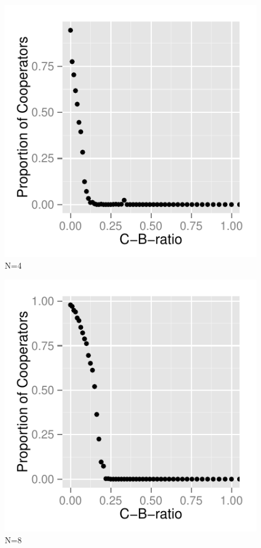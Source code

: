 \documentclass[DIV=calc, paper=a4, fontsize=11pt, twocolumn]{scrartcl}	 %
\begin{document}
\begin{figure}[here]
\centering
\begin{minipage}{.35\textwidth}
  \centering
  \includegraphics[width=1\linewidth]{PDN4}
 \caption{N=4}
\label{fig:PDn1}
\end{minipage}%
\end{figure}

\begin{figure}[here]
\centering
\begin{minipage}{.35\textwidth}
  \centering
  \includegraphics[width=1\linewidth]{PDN8}
 \caption{N=8}
\label{fig:PDm1}
\end{minipage}%
\end{figure}
\end{document}
